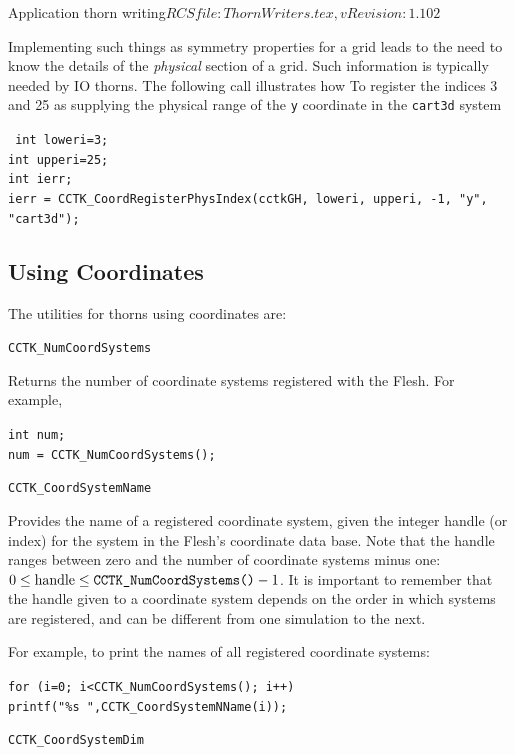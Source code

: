 \begin{cactuspart}{2}{Application thorn writing}{$RCSfile: ThornWriters.tex,v $}{$Revision: 1.102 $}
\begin{Lentry}
Implementing such things as symmetry properties for a grid leads to
the need to know the details of the {\it physical} section of a grid.
Such information is typically needed by IO thorns. The following call
illustrates how To register the
indices 3 and 25 as supplying the physical range of the {\tt y}
coordinate in the {\tt cart3d} system

{\tt
int loweri=3;\\
int upperi=25;\\
int ierr;\\
ierr = CCTK\_CoordRegisterPhysIndex(cctkGH, loweri, upperi, -1, "y", "cart3d");
}



\end{Lentry}

\subsection{Using Coordinates}

The utilities for thorns using coordinates are:

\begin{Lentry}

\item[{\tt CCTK\_NumCoordSystems}]

Returns the number of coordinate systems registered with the Flesh. For example,

{\tt int num;\\
num = CCTK\_NumCoordSystems();
}

\item[{\tt CCTK\_CoordSystemName}]

Provides the name of a registered coordinate system, given the integer
handle (or index) for the system in the Flesh's coordinate data base.
Note that the handle ranges between zero and the number of coordinate systems minus one: $0 \le \mbox{handle} \le \mbox{\tt CCTK\_NumCoordSystems()}-1$.
It is important to remember that the handle given to a coordinate system
depends on the order in which systems are registered, and can be different
from one simulation to the next.

For example, to print the names of all registered coordinate systems:

{\tt for (i=0; i<CCTK\_NumCoordSystems(); i++) \\
 printf("\%s ",CCTK\_CoordSystemNName(i));}

\item[{\tt CCTK\_CoordSystemDim}]


\end{Lentry}
\end{cactuspart}
